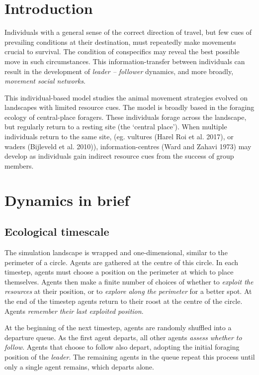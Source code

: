 \linenumbers

\hypertarget{introduction}{%
\section{Introduction}\label{introduction}}

Individuals with a general sense of the correct direction of travel, but
few cues of prevailing conditions at their destination, must repeatedly
make movements crucial to survival. The condition of conspecifics may
reveal the best possible move in such circumstances. This
information-transfer between individuals can result in the development
of \emph{leader -- follower} dynamics, and more broadly, \emph{movement
social networks}.

This individual-based model studies the animal movement strategies
evolved on landscapes with limited resource cues. The model is broadly
based in the foraging ecology of central-place foragers. These
individuals forage across the landscape, but regularly return to a
resting site (the `central place'). When multiple individuals return to
the same site, (eg. vultures (Harel Roi et al. 2017), or waders
(Bijleveld et al. 2010)), information-centres (Ward and Zahavi 1973) may
develop as individuals gain indirect resource cues from the success of
group members.

\hypertarget{dynamics-in-brief}{%
\section{Dynamics in brief}\label{dynamics-in-brief}}

\hypertarget{ecological-timescale}{%
\subsection{Ecological timescale}\label{ecological-timescale}}

The simulation landscape is wrapped and one-dimensional, similar to the
perimeter of a circle. Agents are gathered at the centre of this circle.
In each timestep, agents must choose a position on the perimeter at
which to place themselves. Agents then make a finite number of choices
of whether to \emph{exploit the resources} at their position, or to
\emph{explore along the perimeter} for a better spot. At the end of the
timestep agents return to their roost at the centre of the circle.
Agents \emph{remember their last exploited position}.

At the beginning of the next timestep, agents are randomly shuffled into
a departure queue. As the first agent departs, all other agents
\emph{assess whether to follow}. Agents that choose to follow also
depart, adopting the initial foraging position of the \emph{leader}. The
remaining agents in the queue repeat this process until only a single
agent remains, which departs alone.

